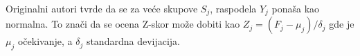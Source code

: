 
Originalni autori tvrde da se za veće skupove $S_j$, raspodela
$Y_j$ ponaša kao normalna. To znači da se ocena Z-skor može dobiti kao
$Z_j=(F_j-\mu_j)/\delta_j$ gde je $\mu_j$ očekivanje, a $\delta_j$ standardna
devijacija. 


